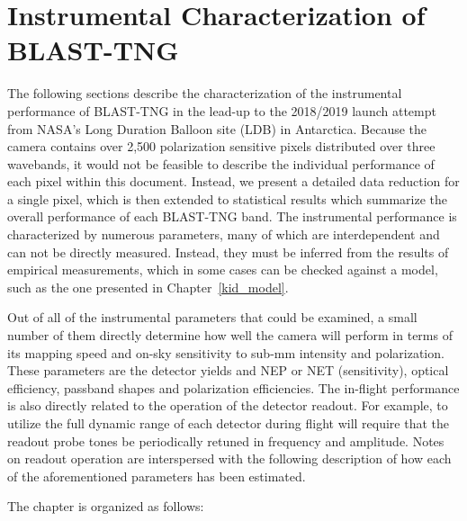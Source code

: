 \chapter{Instrumental Characterization of BLAST-TNG}\label{blast_data}

The following sections describe the characterization of the instrumental performance of BLAST-TNG in the lead-up to the 2018/2019 launch attempt from NASA's Long Duration Balloon site (LDB) in Antarctica. Because the camera contains over 2,500 polarization sensitive pixels distributed over three wavebands, it would not be feasible to describe the individual performance of each pixel within this document. Instead, we present a detailed data reduction for a single pixel, which is then extended to statistical results which summarize the overall performance of each BLAST-TNG band. The instrumental performance is characterized by numerous parameters, many of which are interdependent and can not be directly measured. Instead, they must be inferred from the results of empirical measurements, which in some cases can be checked against a model, such as the one presented in Chapter~\ref{kid_model}.

Out of all of the instrumental parameters that could be examined, a small number of them directly determine how well the camera will perform in terms of its mapping speed and on-sky sensitivity to sub-mm intensity and polarization. These parameters are the detector yields and NEP or NET (sensitivity), optical efficiency, passband shapes and polarization efficiencies. The in-flight performance is also directly related to the operation of the detector readout. For example, to utilize the full dynamic range of each detector during flight will require that the readout probe tones be periodically retuned in frequency and amplitude. Notes on readout operation are interspersed with the following description of how each of the aforementioned parameters has been estimated.

The chapter is organized as follows:


